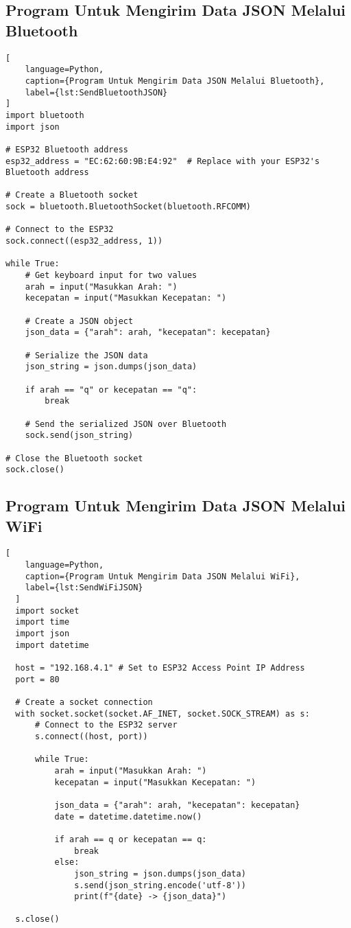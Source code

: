\subsection{Program Untuk Mengirim Data JSON Melalui Bluetooth}

\begin{lstlisting}[
    language=Python,
    caption={Program Untuk Mengirim Data JSON Melalui Bluetooth},
    label={lst:SendBluetoothJSON}
]
import bluetooth
import json

# ESP32 Bluetooth address
esp32_address = "EC:62:60:9B:E4:92"  # Replace with your ESP32's Bluetooth address

# Create a Bluetooth socket
sock = bluetooth.BluetoothSocket(bluetooth.RFCOMM)

# Connect to the ESP32
sock.connect((esp32_address, 1))

while True:
    # Get keyboard input for two values
    arah = input("Masukkan Arah: ")
    kecepatan = input("Masukkan Kecepatan: ")
    
    # Create a JSON object
    json_data = {"arah": arah, "kecepatan": kecepatan}

    # Serialize the JSON data
    json_string = json.dumps(json_data)
    
    if arah == "q" or kecepatan == "q":
        break

    # Send the serialized JSON over Bluetooth
    sock.send(json_string)

# Close the Bluetooth socket
sock.close()

\end{lstlisting}

\subsection{Program Untuk Mengirim Data JSON Melalui WiFi}

\begin{lstlisting}[
    language=Python,
    caption={Program Untuk Mengirim Data JSON Melalui WiFi},
    label={lst:SendWiFiJSON}
  ]
  import socket
  import time
  import json
  import datetime
  
  host = "192.168.4.1" # Set to ESP32 Access Point IP Address
  port = 80
  
  # Create a socket connection
  with socket.socket(socket.AF_INET, socket.SOCK_STREAM) as s:
      # Connect to the ESP32 server
      s.connect((host, port))
      
      while True:
          arah = input("Masukkan Arah: ")
          kecepatan = input("Masukkan Kecepatan: ")
          
          json_data = {"arah": arah, "kecepatan": kecepatan}
          date = datetime.datetime.now()
          
          if arah == q or kecepatan == q:
              break
          else:
              json_string = json.dumps(json_data)
              s.send(json_string.encode('utf-8'))
              print(f"{date} -> {json_data}")
  
  s.close()
  \end{lstlisting}